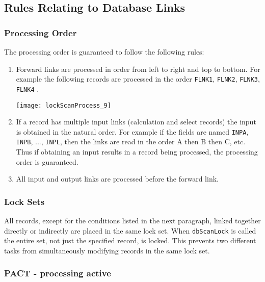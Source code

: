 \subsection{Rules Relating to Database Links}

\subsubsection{Processing Order}

The processing order is guaranteed to follow the following rules:

\begin{enumerate}\item Forward links are processed in order from left to right and top to bottom. For example the following records are 
processed in the order \verb|FLNK1|, \verb|FLNK2|, \verb|FLNK3|, \verb|FLNK4| .

\begin{center}
\texttt{[image: lockScanProcess\_9]}
\end{center}

\item If a record has multiple input links (calculation and select records) the input is obtained in the natural order. For 
example if the fields are named \verb|INPA|, \verb|INPB|, ..., \verb|INPL|, then the links are read in the order A then B then C, etc. 
Thus if obtaining an input results in a record being processed, the processing order is guaranteed.

\item All input and output links are processed before the forward link.

\end{enumerate}

\subsubsection{Lock Sets}

All records, except for the conditions listed in the next paragraph, linked together directly or indirectly are placed in the 
same lock set. When \verb|dbScanLock| is called the entire set, not just the specified record, is locked. This prevents two 
different tasks from simultaneously modifying records in the same lock set.

\subsubsection{PACT - processing active}

